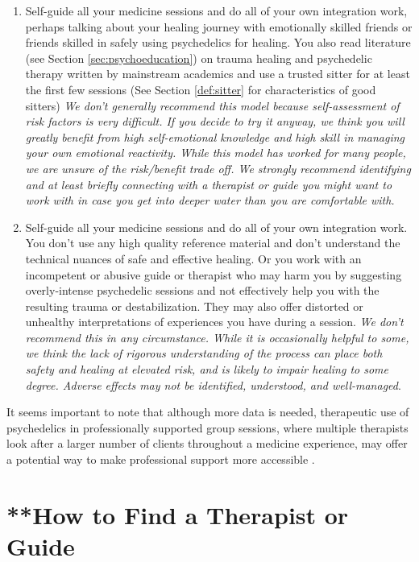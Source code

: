\documentclass[12pt,letterpaper]{book}
\begin{document}
\begin{enumerate}
    \item Self-guide all your medicine sessions and do all of your own integration work, perhaps talking about your healing journey with emotionally skilled friends or friends skilled in safely using psychedelics for healing. You also read literature (see Section \ref{sec:psychoeducation}) on trauma healing and psychedelic therapy written by mainstream academics and use a trusted sitter for at least the first few sessions (See Section \ref{def:sitter} for characteristics of good sitters) \textit{We don't generally recommend this model because self-assessment of risk factors is very difficult. If you decide to try it anyway, we think you will greatly benefit from high self-emotional knowledge and high skill in managing your own emotional reactivity. While this model has worked for many people, we are unsure of the risk/benefit trade off. We strongly recommend identifying and at least briefly connecting with a therapist or guide you might want to work with in case you get into deeper water than you are comfortable with.}
    \item Self-guide all your medicine sessions and do all of your own integration work. You don't use any high quality reference material and don't understand the technical nuances of safe and effective healing. Or you work with an incompetent or abusive guide or therapist who may harm you by suggesting overly-intense psychedelic sessions and not effectively help you with the resulting trauma or destabilization. They may also offer distorted or unhealthy interpretations of experiences you have during a session. \textit{We don't recommend this in any circumstance. While it is occasionally helpful to some, we think the lack of rigorous understanding of the process can place both safety and healing at elevated risk, and is likely to impair healing to some degree. Adverse effects may not be identified, understood, and well-managed}.
\end{enumerate}
It seems important to note that although more data is needed, therapeutic use of psychedelics in professionally supported group sessions, where multiple therapists look after a larger number of clients throughout a medicine experience, may offer a potential way to make professional support more accessible \cite{marseille2023group}.

\section{**How to Find a Therapist or Guide}
\label{sec:howtofind}
\end{document}
